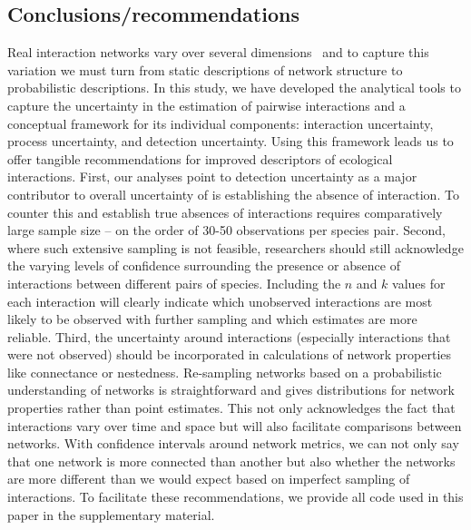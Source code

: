 \documentclass[12pt]{article}
\begin{document}
\begin{spacing}{2.0}
\section*{Conclusions/recommendations}

  Real interaction networks vary over several dimensions~\citep{Kitching1987,Olesen2011a,Pires2011a,Baiser2012,Fodrie2015,Novak2015} and to capture this variation we must turn from static descriptions of network structure to probabilistic descriptions. In this study, we have developed the analytical tools to capture the uncertainty in the estimation of pairwise interactions and a conceptual framework for its individual components: interaction uncertainty, process uncertainty, and detection uncertainty. Using this framework leads us to offer tangible recommendations for improved descriptors of ecological interactions. First, our analyses point to detection uncertainty as a major contributor to overall uncertainty of is establishing the absence of interaction. To counter this and establish true absences of interactions requires comparatively large sample size – on the order of 30-50 observations per species pair. Second, where such extensive sampling is not feasible, researchers should still acknowledge the varying levels of confidence surrounding the presence or absence of interactions between different pairs of species. Including the $n$ and $k$ values for each interaction will clearly indicate which unobserved interactions are most likely to be observed with further sampling and which estimates are more reliable. Third, the uncertainty around interactions (especially interactions that were not observed) should be incorporated in calculations of network properties like connectance or nestedness. Re-sampling networks based on a probabilistic understanding of networks is straightforward and gives distributions for network properties rather than point estimates. This not only acknowledges the fact that interactions vary over time and space but will also facilitate comparisons between networks. With confidence intervals around network metrics, we can not only say that one network is more connected than another but also whether the networks are more different than we would expect based on imperfect sampling of interactions. To facilitate these recommendations, we provide all code used in this paper in the supplementary material. 




\end{spacing}
\end{document}
